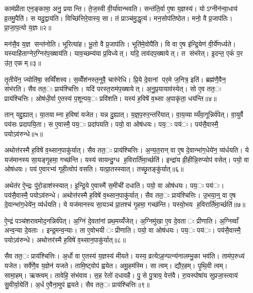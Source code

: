 काम॑प्रीता एन॒ङ्कामा॒ अनु॒ प्रयान्ति। ते॒ज॒स्वी वी॒र्या॑वान्भवति। सन्त॑ति॒र्वा ए॒षा य॒ज्ञस्य॑। योऽग्नीन॑न्वा॒धाय॑ व्र॒तमु॒पैति॑। स यदु॒द्वाय॑ति। विच्छि॑त्तिरे॒वास्य॒ सा। तं प्राञ्च॑मु॒द्धृत्य॑। मन॒सोप॑तिष्ठेत। मनो॒ वै प्र॒जाप॑तिः। प्रा॒जा॒प॒त्यो य॒ज्ञः॥२॥

मन॑सै॒व य॒ज्ञ सन्त॑नोति। भूरित्या॑ह। भू॒तो वै प्र॒जाप॑तिः। भूति॑मे॒वोपै॑ति। वि वा ए॒ष इ॑न्द्रि॒येण॑ वी॒र्ये॑णर्ध्यते। यस्याहि॑ताग्नेर॒ग्निर॑प॒ख्षाय॑ति। याव॒च्छम्य॑या प्र॒विध्येत्। यदि॒ ताव॑दप॒ख्षायेत्। त संभ॑रेत्। इ॒दन्त॒ एकं॑ प॒र उ॑त॒ एकम्॥३॥

तृ॒तीये॑न॒ ज्योति॑षा॒ सव्विँ॑शस्व। स॒व्वेँश॑नस्त॒नुवै॒ चारु॑रेधि। प्रि॒ये दे॒वानां पर॒मे ज॒नित्र॒ इति॑। ब्रह्म॑णै॒वैन॒ संभ॑रति। सैव तत॒ः प्राय॑श्चित्तिः। यदि॑ परस्त॒राम॑प॒ख्षायेत्। अ॒नु॒प्र॒यायाव॑स्येत्। सो ए॒व तत॒ः प्राय॑श्चित्तिः। ओष॑धी॒र्वा ए॒तस्य॑ प॒शून्पय॒ः प्रवि॑शति। यस्य॑ ह॒विषे॑ व॒थ्सा अ॒पाकृ॑ता॒ धय॑न्ति॥४॥

तान् यद्दु॒ह्यात्। या॒तयाम्ना ह॒विषा॑ यजेत। यन्न दु॒ह्यात्। य॒ज्ञ॒प॒रुर॒न्तरि॑यात्। वा॒य॒व्याय्यँवा॒गून्निर्व॑पेत्। वा॒युर्वै पय॑सः प्रदापयि॒ता। स ए॒वास्मै॒ पय॒ः प्रदा॑पयति। पयो॒ वा ओष॑धयः। पय॒ः पय॑ः। पय॑सै॒वास्मै॒ पयोऽव॑रुन्धे॥५॥

अथोत्त॑रस्मै ह॒विषे॑ व॒थ्सान॒पाकु॑र्यात्। सैव तत॒ः प्राय॑श्चित्तिः। अ॒न्य॒त॒रान् वा ए॒ष दे॒वान्भा॑ग॒धेये॑न॒ व्य॑र्धयति। ये यज॑मानस्य सा॒यङ्गृ॒हमा॒ गच्छ॑न्ति। यस्य॑ सायन्दु॒ग्ध ह॒विरार्ति॑मा॒र्च्छति॑। इन्द्रा॑य व्री॒हीन्नि॒रुप्योप॑ वसेत्। पयो॒ वा ओष॑धयः। पय॑ ए॒वारभ्य॑ गृही॒त्वोप॑ वसति। यत्प्रा॒तस्स्यात्। तच्छृ॒तङ्कु॑र्यात्॥६॥

अथेत॑र ऐ॒न्द्रः पु॑रो॒डाश॑स्स्यात्। इ॒न्द्रि॒ये ए॒वास्मै॑ स॒मीची॑ दधाति। पयो॒ वा ओष॑धयः। पय॒ः पय॑ः। पय॑सै॒वास्मै॒ पयोऽव॑रुन्धे। अथोत्त॑रस्मै ह॒विषे॑ व॒थ्सान॒पाकु॑र्यात्। सैव तत॒ः प्राय॑श्चित्तिः। उ॒भया॒न्॒ वा ए॒ष दे॒वान्भा॑ग॒धेये॑न॒ व्य॑र्धयति। ये यज॑मानस्य सा॒यञ्च॑ प्रा॒तश्च॑ गृ॒हमा॒ गच्छ॑न्ति। यस्यो॒भय ह॒विरार्ति॑मा॒र्च्छति॑॥७॥

ऐ॒न्द्रं पञ्च॑शरावमोद॒नन्निर्व॑पेत्। अ॒ग्निं दे॒वता॑नां प्रथ॒मय्यँ॑जेत्। अ॒ग्निमु॑खा ए॒व दे॒वताः प्रीणाति। अ॒ग्निव्वाँ अन्व॒न्या दे॒वताः। इन्द्र॒मन्व॒न्याः। ता ए॒वोभयीः प्रीणाति। पयो॒ वा ओष॑धयः। पय॒ः पय॑ः। पय॑सै॒वास्मै॒ पयोऽव॑रुन्धे। अथोत्तर॑स्मै ह॒विषे॑ व॒थ्सान॒पाकु॑र्यात्॥८॥

सैव तत॒ः प्राय॑श्चित्तिः। अ॒र्धो वा ए॒तस्य॑ य॒ज्ञस्य॑ मीयते। यस्य॒ व्रत्येऽह॒न्पत्न्य॑नालम्भु॒का भव॑ति। ताम॑प॒रुध्य॑ यजेत। सर्वे॑णै॒व य॒ज्ञेन॑ यजते। तामि॒ष्ट्वोप॑ ह्वयेत। अमू॒हम॑स्मि। सा त्वम्। द्यौर॒हम्। पृ॒थि॒वी त्वम्। सामा॒हम्। ऋक्त्वम्। तावेहि॒ संभ॑वाव। स॒ह रेतो॑ दधावहै। पु॒से पु॒त्राय॒ वेत्त॑वै। रा॒यस्पोषा॑य सुप्रजा॒स्त्वाय॑ सु॒वीर्या॒येति॑। अ॒र्ध ए॒वैना॒मुप॑ ह्वयते। सैव तत॒ः प्राय॑श्चित्तिः॥९॥

